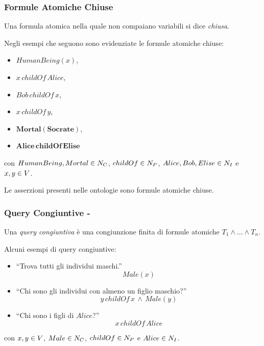 \documentclass[8pt]{beamer}
\begin{document}
\begin{frame}
\frametitle{Formule Atomiche Chiuse}
Una formula atomica nella quale non compaiano variabili si dice \emph{chiusa}.
\vspace{\baselineskip}

Negli esempi che seguono sono evidenziate le formule atomiche chiuse:
\begin{itemize}
 \item $HumanBeing(x)$,
 \item $x\,childOf\,Alice$,
 \item $Bob\,childOf\,x$,
 \item $x\,childOf\,y$,
 \item $\mathbf{Mortal(Socrate)}$,
 \item $\mathbf{Alice\,childOf\,Elise}$
\end{itemize}
con $HumanBeing, Mortal \in N_C$, $childOf \in N_P$, 
$Alice, Bob, Elise \in N_I$ e $x, y \in V$.
\vspace{\baselineskip}

Le asserzioni presenti nelle ontologie sono formule atomiche chiuse.
\end{frame}

\begin{frame}
\frametitle{Query Congiuntive - }
Una \emph{query congiuntiva} \`e una congiunzione finita di formule atomiche $T_1 \wedge \ldots \wedge T_n$.
\vspace{\baselineskip}

Alcuni esempi di query congiuntive:
\begin{itemize}
 \item ``Trova tutti gli individui maschi.''
 \[
  Male(x)
 \]
 \item ``Chi sono gli individui con almeno un figlio maschio?''
\[
 y\,childOf\,x\,\wedge\,Male(y)  
\]
 \item ``Chi sono i figli di $Alice$?''
\[
 x\,childOf\,Alice
\]
 \end{itemize}
con $x, y \in V$, $Male \in N_C$, $childOf \in N_P$ e $Alice \in
N_I$.
\end{frame}
\end{document}
